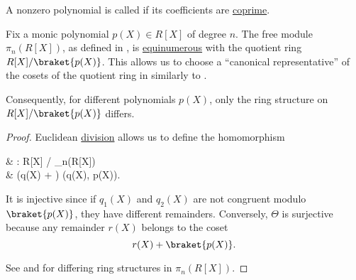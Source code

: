 \begin{definition}\label{def:primitive_polynomial}
  A nonzero polynomial is called  if its coefficients are \hyperref[def:coprime_ring_ideals]{coprime}.
\end{definition}

\begin{proposition}\label{thm:polynomial_quotient_rings_equinumerous_with_module_of_polynomials}
  Fix a monic polynomial \( p(X) \in R[X] \) of degree \( n \). The free module \( \pi_n(R[X]) \), as defined in , is \hyperref[def:equinumerosity]{equinumerous} with the quotient ring \( R[X] / \braket{p(X)} \). This allows us to choose a \enquote{canonical representative} of the cosets of the quotient ring in similarly to .

  Consequently, for different polynomials \( p(X) \), only the ring structure on \( R[X] / \braket{p(X)} \) differs.
\end{proposition}
\begin{proof}
  Euclidean \hyperref[thm:euclidean_division_of_polynomials]{division} allows us to define the homomorphism
  \begin{balign*}
     & \Theta: R[X] /  \to \pi_n(R[X])             \\
     & \Theta(q(X) + ) \coloneqq \rem(q(X), p(X)).
  \end{balign*}

  It is injective since if \( q_1(X) \) and \( q_2(X) \) are not congruent modulo \( \braket{p(X)} \), they have different remainders. Conversely, \( \Theta \) is surjective because any remainder \( r(X) \) belongs to the coset
  \begin{equation*}
    r(X) + \braket{p(X)}.
  \end{equation*}

  See  and  for differing ring structures in \( \pi_n(R[X]) \).
\end{proof}

